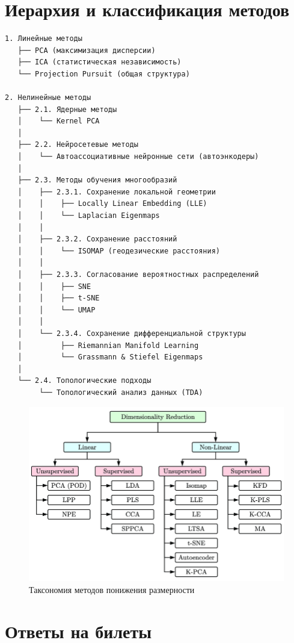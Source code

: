 \documentclass[a4paper,12pt]{article}
\begin{document}
\section{Иерархия и классификация методов}

\begin{verbatim}
1. Линейные методы
   ├── PCA (максимизация дисперсии)
   ├── ICA (статистическая независимость)
   └── Projection Pursuit (общая структура)

2. Нелинейные методы
   ├── 2.1. Ядерные методы
   │    └── Kernel PCA
   │
   ├── 2.2. Нейросетевые методы
   │    └── Автоассоциативные нейронные сети (автоэнкодеры)
   │
   ├── 2.3. Методы обучения многообразий
   │    ├── 2.3.1. Сохранение локальной геометрии
   │    │    ├── Locally Linear Embedding (LLE)
   │    │    └── Laplacian Eigenmaps
   │    │
   │    ├── 2.3.2. Сохранение расстояний
   │    │    └── ISOMAP (геодезические расстояния)
   │    │
   │    ├── 2.3.3. Согласование вероятностных распределений
   │    │    ├── SNE
   │    │    ├── t-SNE
   │    │    └── UMAP
   │    │
   │    └── 2.3.4. Сохранение дифференциальной структуры
   │         ├── Riemannian Manifold Learning
   │         └── Grassmann & Stiefel Eigenmaps
   │
   └── 2.4. Топологические подходы
        └── Топологический анализ данных (TDA)
\end{verbatim}

\begin{figure}[h]
    \centering
    \includegraphics[width=\textwidth]{figs/dim_red_taxonomy.png}
    \caption{Таксономия методов понижения размерности}
    \label{fig:taxonomy}
\end{figure}


\section{Ответы на билеты}
\end{document}
